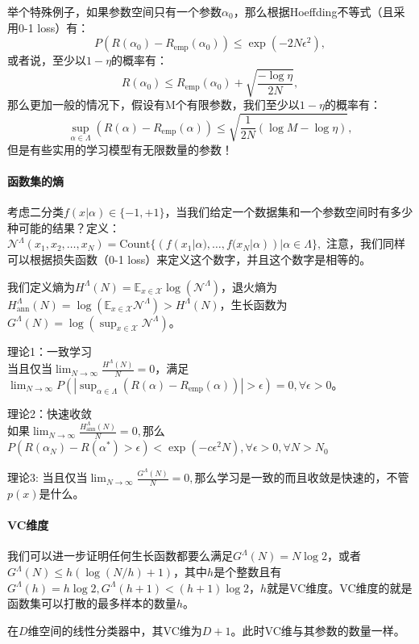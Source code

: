 举个特殊例子，如果参数空间只有一个参数$\alpha_0$，那么根据Hoeffding不等式（且采用0-1 loss）有：
$$P(R(\alpha_0) - R_\text{emp}(\alpha_0)) \le \exp(-2N\epsilon^2),$$
或者说，至少以$1-\eta$的概率有：
$$R(\alpha_0) \le R_\text{emp}(\alpha_0) + \sqrt{\frac{-\log \eta}{2N}},$$
那么更加一般的情况下，假设有M个有限参数，我们至少以$1-\eta$的概率有：
$$
\sup_{\alpha \in \Lambda}(R(\alpha) - R_\text{emp}(\alpha)) \le \sqrt{\frac{1}{2N}(\log M - \log \eta)},
$$
但是有些实用的学习模型有无限数量的参数！

\paragraph{函数集的熵}
考虑二分类$f(x|\alpha) \in \{-1,+1\}$，当我们给定一个数据集和一个参数空间时有多少种可能的结果？定义：
$\mathcal{N}^{\Lambda}(x_1, x_2, \ldots, x_N) = \mathrm{Count}\{(f(x_1|\alpha), \ldots, f(x_N|\alpha)) | \alpha \in \Lambda\},$
注意，我们同样可以根据损失函数（0-1 loss）来定义这个数字，并且这个数字是相等的。

我们定义熵为$H^\Lambda(N) = \mathbb{E}_{x\in \mathcal{X}} \log(\mathcal{N}^\Lambda)$，退火熵为$H_\mathrm{ann}^\Lambda(N) = \log(\mathbb{E}_{x\in \mathcal{X}} \mathcal{N}^\Lambda) > H^\Lambda(N)$，生长函数为$G^\Lambda(N) = \log(\sup_{x\in \mathcal{X}} \mathcal{N}^\Lambda)$。

理论1：一致学习\\
当且仅当$\lim_{N\to \infty} \frac{H^\Lambda(N)}{N} = 0$，满足$\lim_{N\to \infty} P(|\sup_{\alpha \in \Lambda}(R(\alpha) - R_\text{emp}(\alpha))| > \epsilon) = 0, \forall \epsilon > 0$。

理论2：快速收敛\\
如果$\lim_{N\to \infty} \frac{H_\mathrm{ann}^\Lambda(N)}{N} = 0,$那么$P(R(\alpha_N) - R(\alpha^*) > \epsilon) < \exp(-c\epsilon^2N), \forall \epsilon > 0, \forall N > N_0$

理论3:
当且仅当$\lim_{N\to \infty} \frac{G^\Lambda(N)}{N} = 0,$那么学习是一致的而且收敛是快速的，不管$p(x)$是什么。

\paragraph{VC维度}
我们可以进一步证明任何生长函数都要么满足$G^\Lambda(N) = N\log 2$，或者$G^\Lambda(N) \le h(\log (N/h) + 1)$，其中$h$是个整数且有$G^\Lambda(h) = h \log 2, G^\Lambda(h+1) < (h+1)\log 2$，$h$就是VC维度。VC维度的就是函数集可以打散的最多样本的数量$h$。

在$D$维空间的线性分类器中，其VC维为$D+1$。此时VC维与其参数的数量一样。

